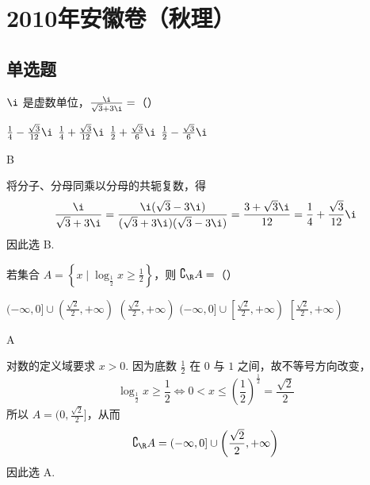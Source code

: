 \chapter{2010年安徽卷（秋理）}

\section{单选题}

\begin{problem}
\(\i\) 是虚数单位，\( \frac{\i}{\sqrt{3} + 3\i} = \)（\quad）

\choices
    {\(\frac{1}{4} - \frac{\sqrt{3}}{12}\i\)}
    {\(\frac{1}{4} + \frac{\sqrt{3}}{12}\i\)}
    {\(\frac{1}{2} + \frac{\sqrt{3}}{6}\i\)}
    {\(\frac{1}{2} - \frac{\sqrt{3}}{6}\i\)}
\end{problem}

\begin{answer}
B
\end{answer}

\begin{solution}
将分子、分母同乘以分母的共轭复数，得
\[
\frac{\i}{\sqrt{3}+3\i}
=\frac{\i(\sqrt{3}-3\i)}{(\sqrt{3}+3\i)(\sqrt{3}-3\i)}
=\frac{3+\sqrt{3}\i}{12}
=\frac{1}{4}+\frac{\sqrt{3}}{12}\i
\]
因此选 B.
\end{solution}

\begin{problem}
若集合 \(A = \left\{x \mid \log_{\frac{1}{2}} x \geqslant \frac{1}{2}\right\}\)，则 \(\complement_{\R} A =\)（\quad）

\choices
    {\((-\infty, 0] \cup \left(\frac{\sqrt{2}}{2}, +\infty\right)\)}
    {\(\left(\frac{\sqrt{2}}{2}, +\infty\right)\)}
    {\((-\infty, 0] \cup \left[\frac{\sqrt{2}}{2}, +\infty\right)\)}
    {\(\left[\frac{\sqrt{2}}{2}, +\infty\right)\)}
\end{problem}

\begin{answer}
A
\end{answer}

\begin{solution}
对数的定义域要求 \(x>0\). 因为底数 \(\frac{1}{2}\) 在 \(0\) 与 \(1\) 之间，故不等号方向改变，
\[
\log_{\frac{1}{2}}x\geqslant\frac{1}{2}
\Longleftrightarrow
0<x\leqslant\left(\frac{1}{2}\right)^{\frac{1}{2}}=\frac{\sqrt{2}}{2}
\]
所以 \(A=(0,\frac{\sqrt{2}}{2}]\)，从而
\[
\complement_{\R}A=(-\infty,0]\cup\left(\frac{\sqrt{2}}{2},+\infty\right)
\]
因此选 A.
\end{solution}

